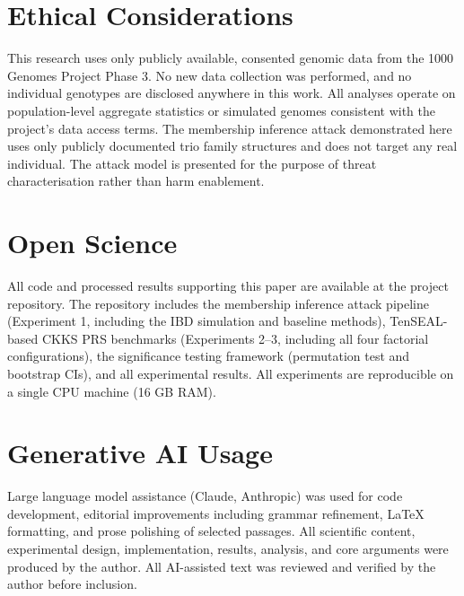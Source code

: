 \documentclass[conference]{IEEEtran}
\begin{document}
\section*{Ethical Considerations}

This research uses only publicly available, consented genomic data from the
1000 Genomes Project Phase 3. No new data collection was performed, and no
individual genotypes are disclosed anywhere in this work. All analyses operate
on population-level aggregate statistics or simulated genomes consistent with
the project's data access terms. The membership inference attack demonstrated
here uses only publicly documented trio family structures and does not target
any real individual. The attack model is presented for the purpose of threat
characterisation rather than harm enablement.

\section*{Open Science}

All code and processed results supporting this paper are available at the
project repository. The repository includes the membership inference attack
pipeline (Experiment 1, including the IBD simulation and baseline methods),
TenSEAL-based CKKS PRS benchmarks (Experiments 2--3, including all four
factorial configurations), the significance testing framework (permutation
test and bootstrap CIs), and all experimental results. All experiments are
reproducible on a single CPU machine (16 GB RAM).

\section*{Generative AI Usage}

Large language model assistance (Claude, Anthropic) was used for code
development, editorial improvements including grammar refinement, \LaTeX{}
formatting, and prose polishing of selected passages. All scientific content,
experimental design, implementation, results, analysis, and core arguments
were produced by the author. All AI-assisted text was reviewed and verified
by the author before inclusion.
\end{document}
